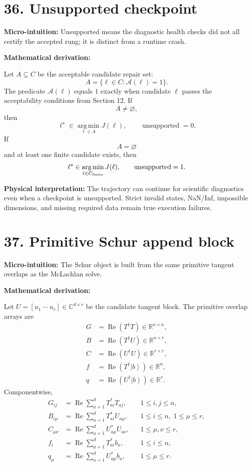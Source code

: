 \documentclass[10pt,twocolumn]{article}
\newcommand{\ket}[1]{\left|#1\right\rangle}
\newcommand{\R}{\mathbb R}
\newcommand{\C}{\mathbb C}
\newcommand{\argmin}{\operatorname*{arg\,min}}
\newcommand{\Real}{\operatorname{Re}}
\newcommand{\micro}[1]{%
  \par\smallskip
  \noindent\textcolor{deepblue}{\textbf{Micro-intuition:}} #1
  \par\smallskip}
\newcommand{\deriv}{%
  \par\noindent\textcolor{deepviolet}{\textbf{Mathematical derivation:}}\par\vspace{-1mm}}
\newcommand{\phys}[1]{%
  \par\smallskip
  \noindent\textcolor{deepgreen}{\textbf{Physical interpretation:}} #1
  \par\smallskip}
\begin{document}
\section*{36. Unsupported checkpoint}

\micro{Unsupported means the diagnostic health checks did not all certify the
accepted rung; it is distinct from a runtime crash.}

\deriv
Let \(A\subseteq C\) be the acceptable candidate repair set:
\[
A=\{\ell\in C:\mathcal A(\ell)=1\}.
\]
The predicate \(\mathcal A(\ell)\) equals \(1\) exactly when candidate \(\ell\)
passes the acceptability conditions from Section 12.
If
\[
A\ne\varnothing,
\]
then
\[
\ell^\star\in\argmin_{\ell\in A}J(\ell),
\qquad
\operatorname{unsupported}=0.
\]
If
\[
A=\varnothing
\]
and at least one finite candidate exists, then
\[
\ell^\star\in\argmin_{\ell\in C_{\rm finite}}J(\ell),
\qquad
\operatorname{unsupported}=1.
\]

\phys{The trajectory can continue for scientific diagnostics even when a
checkpoint is unsupported. Strict invalid states, NaN/Inf, impossible
dimensions, and missing required data remain true execution failures.}

\section*{37. Primitive Schur append block}

\micro{The Schur object is built from the same primitive tangent overlaps as
the McLachlan solve.}

\deriv
Let \(U=[u_1~\cdots~u_r]\in\C^{d\times r}\) be the candidate tangent block.
The primitive overlap arrays are
\[
\begin{aligned}
G&=\Real(T^\dagger T)\in\R^{n\times n},\\
B&=\Real(T^\dagger U)\in\R^{n\times r},\\
C&=\Real(U^\dagger U)\in\R^{r\times r},\\
f&=\Real(T^\dagger\ket b)\in\R^n,\\
q&=\Real(U^\dagger\ket b)\in\R^r.
\end{aligned}
\]
Componentwise,
\[
\begin{aligned}
G_{ij}
&=\Real\sum_{a=1}^{d}T_{ai}^\ast T_{aj},
&&1\le i,j\le n,\\
B_{i\mu}
&=\Real\sum_{a=1}^{d}T_{ai}^\ast U_{a\mu},
&&1\le i\le n,\;1\le\mu\le r,\\
C_{\mu\nu}
&=\Real\sum_{a=1}^{d}U_{a\mu}^\ast U_{a\nu},
&&1\le\mu,\nu\le r,\\
f_i
&=\Real\sum_{a=1}^{d}T_{ai}^\ast b_a,
&&1\le i\le n,\\
q_\mu
&=\Real\sum_{a=1}^{d}U_{a\mu}^\ast b_a,
&&1\le\mu\le r.
\end{aligned}
\]
\end{document}
